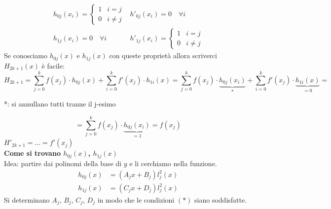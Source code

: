 \documentclass[12pt,a4paper,]{report}
\begin{document}
\[
\begin{array}{cc}
     h_{0j}(x_i) = 
\begin{cases} 
1 & i = j \\ 
0 & i \neq j 
\end{cases} &  
h'_{0j}(x_i) = 0 \quad \forall i\\
   h_{1j}(x_i) = 0  \quad \forall i&  h'_{1j}(x_i) = 
\begin{cases}
1 & i = j \\ 
0 & i \neq j 
\end{cases}
\end{array}
\]
Se conosciamo $h_{0j}(x)$ e $h_{1j}(x)$ con queste proprietà allora scriverci $H_{2k+1}(x)$ è facile:
\[
H_{2k+1} = \sum_{j=0}^{k} f(x_j) \cdot h_{0j}(x) + \sum_{i=0}^{k} f'(x_j) \cdot h_{1i}(x)
=\sum_{j=0}^{k} f(x_j) \cdot \underbrace{h_{0j}(x_i)}_{*} + \sum_{i=0}^{k} f'(x_j) \cdot \underbrace{h_{1i}(x)}_{=0}=
\]
\begin{nota}
    *: si annullano tutti tranne il j-esimo
\end{nota}
\[
=\sum_{j=0}^{k} f(x_j) \cdot \underbrace{h_{0j}(x_i)}_{=1} = f(x_j)
\]
$H'_{2k+1} = \dots = f'(x_j)$\\
\textbf{Come si trovano $h_{0j}(x)$, $h_{1j}(x)$}\\
Idea: partire dai polinomi della base di $y$ e li cerchiamo nella funzione.
\begin{align*}
h_{0j}(x) &= (A_j x + B_j)l_j^2(x) \\
h_{1j}(x) &= (C_j x + D_j)l_j^2(x)
\end{align*}
Si determinano $A_j$, $B_j$, $C_j$, $D_j$ in modo che le condizioni $(*)$ siano soddisfatte.
 
\begin{lezione}
    [Lezione 15 22/04]
\end{lezione}
\end{document}
